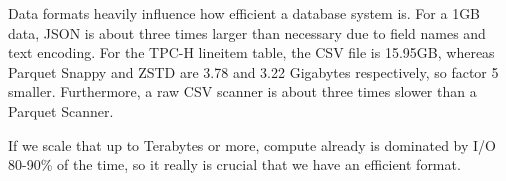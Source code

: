 Data formats heavily influence how efficient a database system is.
For a 1GB data, JSON is about three times larger than necessary due to field names and text encoding.
For the TPC-H lineitem table, the CSV file is 15.95GB, whereas Parquet Snappy and ZSTD are 3.78 and 3.22 Gigabytes respectively,
so factor 5 smaller. Furthermore, a raw CSV scanner is about three times slower than a Parquet Scanner.

If we scale that up to Terabytes or more, compute already is dominated by I/O 80-90\% of the time, so it really is crucial that we have an efficient format.
